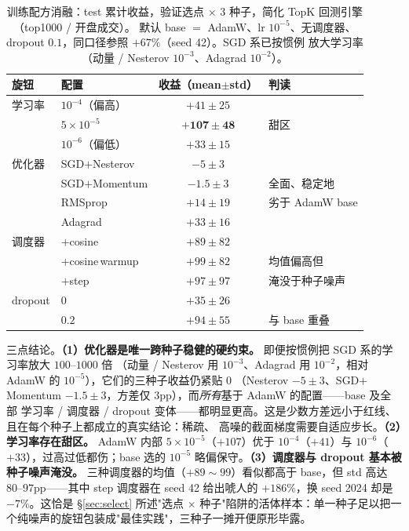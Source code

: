 \documentclass[a4paper,11pt,fontset=fandol]{ctexart}
\begin{document}
\begin{table}[H]
\centering
\caption{训练配方消融：test 累计收益，验证选点 $\times$ 3 种子，简化 TopK 回测引擎（top1000 / 开盘成交）。
默认 base $=$ AdamW、lr $10^{-5}$、无调度器、dropout $0.1$，同口径参照 $+67\%$（seed 42）。SGD 系已按惯例
放大学习率（动量 / Nesterov $10^{-3}$、Adagrad $10^{-2}$）。}
\label{tab:recipe}
\begin{tabular}{llcl}
\toprule
旋钮 & 配置 & 收益（mean$\pm$std） & 判读 \\
\midrule
学习率   & $10^{-4}$（偏高）       & $+41\pm25$           & \\
         & $5\times10^{-5}$       & $\mathbf{+107\pm48}$ & 甜区 \\
         & $10^{-6}$（偏低）       & $+33\pm15$           & \\
\midrule
优化器   & SGD$+$Nesterov         & $-5\pm3$    & \\
         & SGD$+$Momentum         & $-1.5\pm3$  & 全面、稳定地 \\
         & RMSprop                & $+14\pm19$  & 劣于 AdamW base \\
         & Adagrad                & $+33\pm16$  & \\
\midrule
调度器   & $+$cosine              & $+89\pm82$  & \\
         & $+$cosine\,warmup      & $+99\pm82$  & 均值偏高但 \\
         & $+$step                & $+97\pm97$  & 淹没于种子噪声 \\
\midrule
dropout  & $0$                    & $+35\pm26$  & \\
         & $0.2$                  & $+94\pm55$  & 与 base 重叠 \\
\bottomrule
\end{tabular}
\end{table}

三点结论。\textbf{\heiti（1）优化器是唯一跨种子稳健的硬约束。} 即便按惯例把 SGD 系的学习率放大 $100$–$1000$ 倍
（动量 / Nesterov 用 $10^{-3}$、Adagrad 用 $10^{-2}$，相对 AdamW 的 $10^{-5}$），它们的三种子收益仍紧贴 $0$
（Nesterov $-5\pm3$、SGD$+$Momentum $-1.5\pm3$，方差仅 $3$pp），而\emph{所有}基于 AdamW 的配置——base 及全部
学习率 / 调度器 / dropout 变体——都明显更高。这是少数方差远小于红线、且在每个种子上都成立的真实结论：稀疏、
高噪的截面梯度需要自适应步长。\textbf{\heiti（2）学习率存在甜区。} AdamW 内部 $5\times10^{-5}$（$+107$）优于
$10^{-4}$（$+41$）与 $10^{-6}$（$+33$），过高过低都伤；base 选的 $10^{-5}$ 略偏保守。\textbf{\heiti（3）调度器与
dropout 基本被种子噪声淹没。} 三种调度器的均值（$+89\sim99$）看似都高于 base，但 std 高达 $80$–$97$pp——其中
step 调度器在 seed 42 给出唬人的 $+186\%$，换 seed 2024 却是 $-7\%$。这恰是 §\ref{sec:select} 所述"选点 $\times$
种子"陷阱的活体样本：单一种子足以把一个纯噪声的旋钮包装成"最佳实践"，三种子一摊开便原形毕露。
\end{document}
